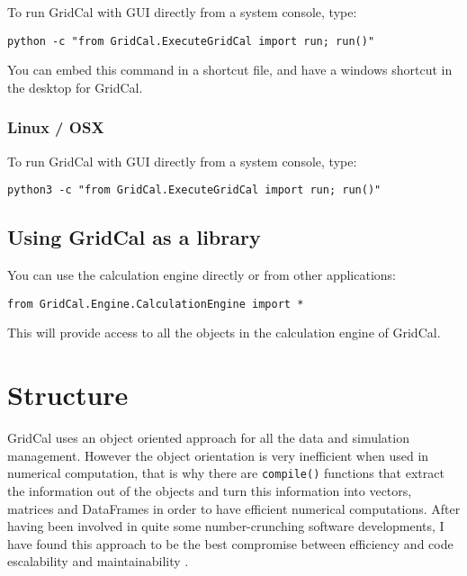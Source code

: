 \documentclass[11pt,fleqn]{book} %
\begin{document}
To run GridCal with GUI directly from a system console, type:\newline

\verb|python -c "from GridCal.ExecuteGridCal import run; run()"|\newline

You can embed this command in a shortcut file, and have a windows shortcut in the desktop for GridCal.

\subsection{Linux / OSX}

To run GridCal with GUI directly from a system console, type:\newline

\verb|python3 -c "from GridCal.ExecuteGridCal import run; run()"|\newline



\section{Using GridCal as a library}

You can use the calculation engine directly or from other applications: \newline

\verb|from GridCal.Engine.CalculationEngine import *| \newline

This will provide access to all the objects in the calculation engine of GridCal.



\chapter{Structure}

GridCal uses an object oriented approach for all the data and simulation management. However the object orientation is very inefficient when used in numerical computation, that is why there are \verb|compile()| functions that extract the information out of the objects and turn this information into vectors, matrices and DataFrames in order to have efficient numerical computations. After having been involved in quite some number-crunching software developments, I have found this approach to be the best compromise between efficiency and code escalability and maintainability .
\end{document}
